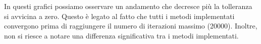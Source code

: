 In questi grafici possiamo osservare un andamento che decresce più la tolleranza
si avvicina a zero. Questo è legato al fatto che tutti i metodi implementati
convergono prima di raggiungere il numero di iterazioni massimo (20000). Inoltre,
non si riesce a notare una differenza significativa tra i metodi implementati.


